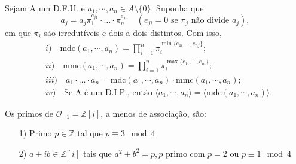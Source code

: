 \documentclass[AlgebraII/algebraII_notes.tex]{subfiles}
\begin{document}
\begin{theorem*}[Exercício]
	Sejam A um D.F.U. e \(a_{1}, \cdots, a_{n}\in A\setminus{\{0\}}.\) Suponha que
	\[
		a_{j} = a_{j}\pi_{1}^{e_{j1}}\cdot\dotsc \cdot \pi_{n}^{e_{jn}} \quad (e_{ji} = 0 \text{ se } \pi_{j} \text{ não divide } a_{j}),
	\]
	em que \(\pi_{i}\) são irredutíveis e dois-a-dois distintos. Com isso,
	\begin{align*}
		 & i)\quad\mathrm{mdc}(a_{1},\cdots,a_{n}) = \prod\limits_{i=1}^{n}\pi_{i}^{\min\{e_{1i}, \cdots, e_{nj}\}};                            \\
		 & ii)\quad \mathrm{mmc}(a_{1}, \cdots, a_{n}) = \prod\limits_{i=1}^{n}\pi_{i}^{\max\{e_{1i}, \cdots, e_{ni}\}};                        \\
		 & iii)\quad a_{1}\cdot \dotsc \cdot  a_{n} = \mathrm{mdc}(a_{1}, \cdots, a_{n})\cdot \mathrm{mmc}(a_{1}, \cdots, a_{n});               \\
		 & iv)\quad \text{Se A é um D.I.P., então }  \langle a_{1}, \cdots, a_{n} \rangle = \langle \mathrm{mdc}(a_{1}, \cdots, a_{n}) \rangle.
	\end{align*}
\end{theorem*}
\begin{prop*}
	Os primos de \(\mathcal{O}_{-1} = \mathbb{Z}[i]\), a menos de associação, são:
	\begin{itemize}
		\item[1)] Primo \(p\in \mathbb{Z}\) tal que \(p\equiv 3 \mod 4\)
		\item[2)] \(a+ib\in \mathbb{Z}[i]\) tais que \(a^{2} + b^{2} = p, p\) primo com \(p = 2\) ou \(p\equiv 1 \mod 4\)
	\end{itemize}
\end{prop*}
\end{document}
